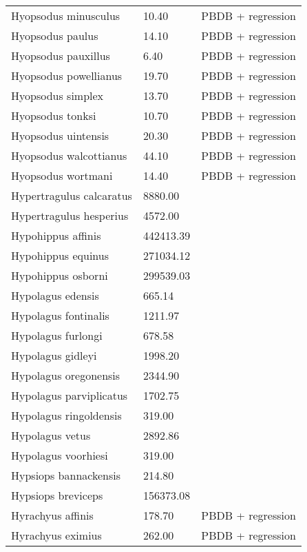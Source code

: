 \begin{longtable}{p{} p{} p{}}
    Hyopsodus minusculus & 10.40 & PBDB + regression \\ 
    Hyopsodus paulus & 14.10 & PBDB + regression \\ 
    Hyopsodus pauxillus & 6.40 & PBDB + regression \\ 
    Hyopsodus powellianus & 19.70 & PBDB + regression \\ 
    Hyopsodus simplex & 13.70 & PBDB + regression \\ 
    Hyopsodus tonksi & 10.70 & PBDB + regression \\ 
    Hyopsodus uintensis & 20.30 & PBDB + regression \\ 
    Hyopsodus walcottianus & 44.10 & PBDB + regression \\ 
    Hyopsodus wortmani & 14.40 & PBDB + regression \\ 
    Hypertragulus calcaratus & 8880.00 & \cite{McKenna2011} \\ 
    Hypertragulus hesperius & 4572.00 & \cite{McKenna2011} \\ 
    Hypohippus affinis & 442413.39 & \cite{Tomiya2013} \\ 
    Hypohippus equinus & 271034.12 & \cite{Tomiya2013} \\ 
    Hypohippus osborni & 299539.03 & \cite{Tomiya2013} \\ 
    Hypolagus edensis & 665.14 & \cite{Tomiya2013} \\ 
    Hypolagus fontinalis & 1211.97 & \cite{Tomiya2013} \\ 
    Hypolagus furlongi & 678.58 & \cite{Tomiya2013} \\ 
    Hypolagus gidleyi & 1998.20 & \cite{Tomiya2013} \\ 
    Hypolagus oregonensis & 2344.90 & \cite{Tomiya2013} \\ 
    Hypolagus parviplicatus & 1702.75 & \cite{Tomiya2013} \\ 
    Hypolagus ringoldensis & 319.00 & \cite{McKenna2011} \\ 
    Hypolagus vetus & 2892.86 & \cite{Tomiya2013} \\ 
    Hypolagus voorhiesi & 319.00 & \cite{McKenna2011} \\ 
    Hypsiops bannackensis & 214.80 & \cite{Wang1999} \\ 
    Hypsiops breviceps & 156373.08 & \cite{Tomiya2013} \\ 
    Hyrachyus affinis & 178.70 & PBDB + regression \\ 
    Hyrachyus eximius & 262.00 & PBDB + regression \\ 

\end{longtable}

